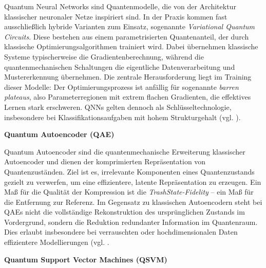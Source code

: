 Quantum Neural Networks sind Quantenmodelle, die von der Architektur klassischer neuronaler Netze inspiriert sind. In der Praxis kommen fast ausschließlich hybride Varianten zum Einsatz, sogenannte \textit{Variational Quantum Circuits}. Diese bestehen aus einem parametrisierten Quantenanteil, der durch klassische Optimierungsalgorithmen trainiert wird. Dabei übernehmen klassische Systeme typischerweise die Gradientenberechnung, während die quantenmechanischen Schaltungen die eigentliche Datenverarbeitung und Mustererkennung übernehmen. Die zentrale Herausforderung liegt im Training dieser Modelle: Der Optimierungsprozess ist anfällig für sogenannte \textit{barren plateaus}, also Parameterregionen mit extrem flachen Gradienten, die effektives Lernen stark erschweren. QNNs gelten dennoch als Schlüsseltechnologie, insbesondere bei Klassifikationsaufgaben mit hohem Strukturgehalt (vgl. \cite{liuQuantumTrainRethinkingHybrid2024}).


\textbf{Quantum Autoencoder (QAE)}

Quantum Autoencoder sind die quantenmechanische Erweiterung klassischer Autoencoder und dienen der komprimierten Repräsentation von Quantenzuständen. Ziel ist es, irrelevante Komponenten eines Quantenzustands gezielt zu verwerfen, um eine effizientere, latente Repräsentation zu erzeugen. Ein Maß für die Qualität der Kompression ist die \textit{TrashState-Fidelity} – ein Maß für die Entfernung zur Referenz. Im Gegensatz zu klassischen Autoencodern steht bei QAEs nicht die vollständige Rekonstruktion des ursprünglichen Zustands im Vordergrund, sondern die Reduktion redundanter Information im Quantenraum. Dies erlaubt insbesondere bei verrauschten oder hochdimensionalen Daten effizientere Modellierungen (vgl. \cite{ngairangbam_anomaly_2022, schuld_et_al_quantum_2019}.


\textbf{Quantum Support Vector Machines (QSVM)}

